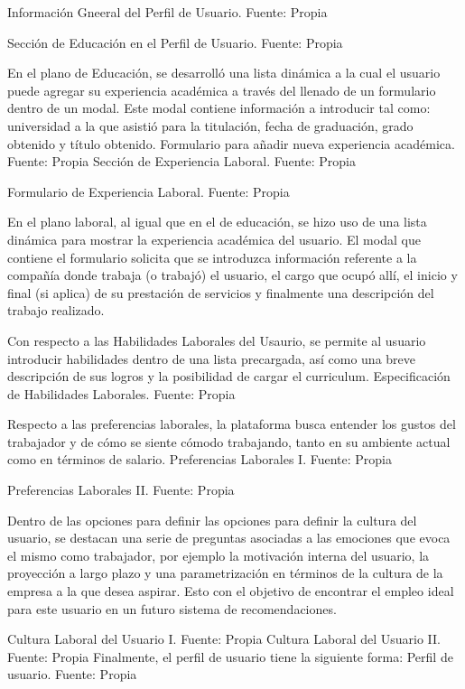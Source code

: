 Información Gneeral del Perfil de Usuario. Fuente: Propia

Sección de Educación en el Perfil de Usuario. Fuente: Propia

En el plano de Educación, se desarrolló una lista dinámica a la cual el usuario puede agregar su experiencia académica a través del llenado de un formulario dentro de un modal. Este modal contiene información a introducir tal como: universidad a la que asistió para la titulación, fecha de graduación, grado obtenido y título obtenido.
Formulario para añadir nueva experiencia académica. Fuente: Propia
Sección de Experiencia Laboral. Fuente: Propia


Formulario de Experiencia Laboral. Fuente: Propia

En el plano laboral, al igual que en el de educación, se hizo uso de una lista dinámica para mostrar la experiencia académica del usuario. El modal que contiene el formulario solicita que se introduzca información referente a la compañía donde trabaja (o trabajó) el usuario, el cargo que ocupó allí, el inicio y final (si aplica) de su prestación de servicios y finalmente una descripción del trabajo realizado.

Con respecto a las Habilidades Laborales del Usaurio, se permite al usuario introducir habilidades dentro de una lista precargada, así como una breve descripción de sus logros y la posibilidad de cargar el curriculum.
Especificación de Habilidades Laborales. Fuente: Propia

Respecto a las preferencias laborales, la plataforma busca entender los gustos del trabajador y de cómo se siente cómodo trabajando, tanto en su ambiente actual como en términos de salario.
Preferencias Laborales I. Fuente: Propia

Preferencias Laborales II. Fuente: Propia

Dentro de las opciones para definir las opciones para definir la cultura del usuario, se destacan una serie de preguntas asociadas a las emociones que evoca el mismo como trabajador, por ejemplo la motivación interna del usuario, la proyección a largo plazo y una parametrización en términos de la cultura de la empresa a la que desea aspirar. Esto con el objetivo de encontrar el empleo ideal para este usuario en un futuro sistema de recomendaciones.

Cultura Laboral del Usuario I. Fuente: Propia
Cultura Laboral del Usuario II. Fuente: Propia
Finalmente, el perfil de usuario tiene la siguiente forma:
Perfil de usuario. Fuente: Propia

